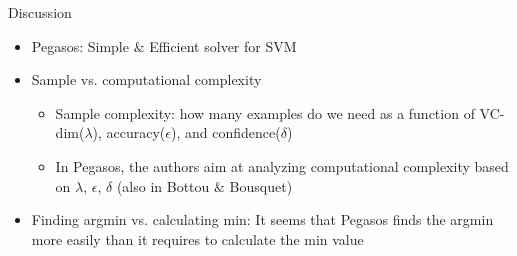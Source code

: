 \begin{frame}{Discussion}
    \begin{itemize}
        \item Pegasos: Simple $\&$ Efficient solver for SVM
        \item Sample vs. computational complexity
            \begin{itemize}
                \item Sample complexity: how many examples do we need as a function of VC-dim($\lambda$), accuracy($\epsilon$), and confidence($\delta$)
                \item In Pegasos, the authors aim at analyzing computational complexity based on $\lambda$, $\epsilon$, $\delta$ (also in Bottou $\&$ Bousquet)
            \end{itemize}
        \item Finding argmin vs. calculating min: It seems that Pegasos finds the argmin more easily than it requires to calculate the min value
    \end{itemize}
\end{frame}

